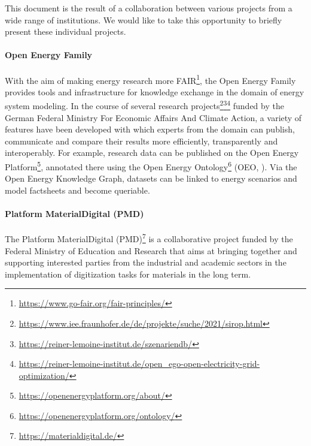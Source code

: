 This document is the result of a collaboration between various projects from a wide range of institutions. We would like to take this opportunity to briefly present these individual projects.

\paragraph{Open Energy Family}

With the aim of making energy research more FAIR\footnote{\url{https://www.go-fair.org/fair-principles/}}, the Open Energy Family provides tools and infrastructure for knowledge exchange in the domain of energy system modeling. In the course of several research projects\footnote{\url{https://www.iee.fraunhofer.de/de/projekte/suche/2021/sirop.html}}\footnote{\url{https://reiner-lemoine-institut.de/szenariendb/}}\footnote{\url{https://reiner-lemoine-institut.de/open_ego-open-electricity-grid-optimization/}} funded by the German Federal Ministry For Economic Affairs And Climate Action, a variety of features have been developed with which experts from the domain can publish, communicate and compare their results more efficiently, transparently and interoperably. For example, research data can be published on the Open Energy Platform\footnote{\url{https://openenergyplatform.org/about/}}, annotated there using the Open Energy Ontology\footnote{\url{https://openenergyplatform.org/ontology/}} (OEO, \cite{oeo2021}). Via the Open Energy Knowledge Graph, datasets can be linked to energy scenarios and model factsheets and become queriable.

\paragraph{Platform MaterialDigital (PMD)}

The Platform MaterialDigital (PMD)\footnote{\url{https://materialdigital.de/}} is a collaborative project funded by the Federal Ministry of Education and Research that aims at bringing together and supporting interested parties from the industrial and academic sectors in the implementation of digitization tasks for materials in the long term.

